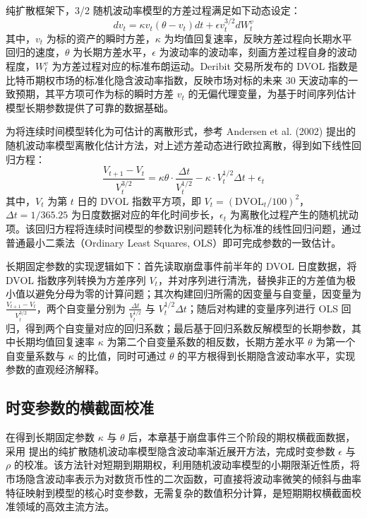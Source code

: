 纯扩散框架下，3/2 随机波动率模型的方差过程满足如下动态设定\citet{baldeauxEXACTSIMULATION322012}：
\[
dv_t = \kappa v_t (\theta - v_t) dt + \epsilon v_t^{3/2} dW_t^v
\]
其中，$v_t$ 为标的资产的瞬时方差，$\kappa$ 为均值回复速率，反映方差过程向长期水平回归的速度，$\theta$ 为长期方差水平，$\epsilon$ 为波动率的波动率，刻画方差过程自身的波动程度，$W_t^v$ 为方差过程对应的标准布朗运动。Deribit 交易所发布的 DVOL 指数是比特币期权市场的标准化隐含波动率指数，反映市场对标的未来 30 天波动率的一致预期，其平方项可作为标的瞬时方差 $v_t$ 的无偏代理变量，为基于时间序列估计模型长期参数提供了可靠的数据基础。

为将连续时间模型转化为可估计的离散形式，参考 Andersen et al. (2002) 提出的随机波动率模型离散化估计方法，对上述方差动态进行欧拉离散，得到如下线性回归方程：
\[
\frac{V_{t+1}-V_t}{V_t^{3/2}} = \kappa \theta \cdot \frac{\Delta t}{V_t^{1/2}} - \kappa \cdot V_t^{1/2} \Delta t + \epsilon_t
\]
其中，$V_t$ 为第 $t$ 日的 DVOL 指数平方项，即 $V_t = (\text{DVOL}_t / 100)^2$，$\Delta t = 1/365.25$ 为日度数据对应的年化时间步长，$\epsilon_t$ 为离散化过程产生的随机扰动项。该回归方程将连续时间模型的参数识别问题转化为标准的线性回归问题，通过普通最小二乘法（Ordinary Least Squares, OLS）即可完成参数的一致估计。

长期固定参数的实现逻辑如下：首先读取崩盘事件前半年的 DVOL 日度数据，将 DVOL 指数序列转换为方差序列 $V_t$，并对序列进行清洗，替换非正的方差值为极小值以避免分母为零的计算问题；其次构建回归所需的因变量与自变量，因变量为 $\frac{V_{t+1}-V_t}{V_t^{3/2}}$，两个自变量分别为 $\frac{\Delta t}{V_t^{1/2}}$ 与 $V_t^{1/2} \Delta t$；随后对构建的变量序列进行 OLS 回归，得到两个自变量对应的回归系数；最后基于回归系数反解模型的长期参数，其中长期均值回复速率 $\kappa$ 为第二个自变量系数的相反数，长期方差水平 $\theta$ 为第一个自变量系数与 $\kappa$ 的比值，同时可通过 $\theta$ 的平方根得到长期隐含波动率水平，实现参数的直观经济解释。

\subsection{时变参数的横截面校准}

在得到长期固定参数 $\kappa$ 与 $\theta$ 后，本章基于崩盘事件三个阶段的期权横截面数据，采用 \citet{medvedevApproximationCalibrationShortTerm2007} 提出的纯扩散随机波动率模型隐含波动率渐近展开方法，完成时变参数 $\epsilon$ 与 $\rho$ 的校准。该方法针对短期到期期权，利用随机波动率模型的小期限渐近性质，将市场隐含波动率表示为对数货币性的二次函数，可直接将波动率微笑的倾斜与曲率特征映射到模型的核心时变参数，无需复杂的数值积分计算，是短期期权横截面校准领域的高效主流方法。

